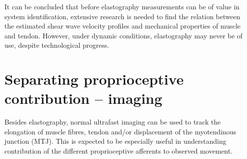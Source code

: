 It can be concluded that before elastography measurements can be of value in system identification, extensive research is needed to find the relation between the estimated shear wave velocity profiles and mechanical properties of muscle and tendon. However, under dynamic conditions, elastography may never be of use, despite technological progress. 


%
%
%
%
%


















\section{Separating proprioceptive contribution -- imaging}
Besides elastography, normal ultrafast imaging can be used to track the elongation of muscle fibres, tendon and/or displacement of the myotendinous junction (MTJ). This is expected to be especially useful in understanding contribution of the different proprioceptive afferents to observed movement. 


